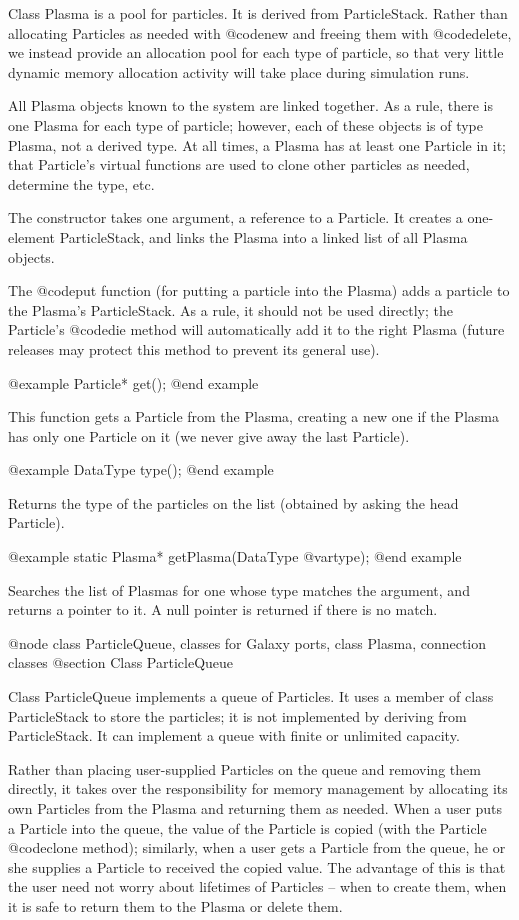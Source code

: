 Class Plasma is a pool for particles.  It is derived from ParticleStack.
Rather than allocating Particles as needed with @code{new} and freeing
them with @code{delete}, we instead provide an allocation pool for each
type of particle, so that very little dynamic memory allocation activity
will take place during simulation runs.

All Plasma objects known to the system are linked together.  As a rule,
there is one Plasma for each type of particle; however, each of these
objects is of type Plasma, not a derived type.  At all times, a Plasma
has at least one Particle in it; that Particle's virtual functions are
used to clone other particles as needed, determine the type, etc.

The constructor takes one argument, a reference to a Particle.  It
creates a one-element ParticleStack, and links the Plasma into a linked
list of all Plasma objects.

The @code{put} function (for putting a particle into the Plasma) adds a
particle to the Plasma's ParticleStack.  As a rule, it should not be
used directly; the Particle's @code{die} method will automatically add
it to the right Plasma (future releases may protect this method to
prevent its general use).

@example
Particle* get();
@end example

This function gets a Particle from the Plasma, creating a new one if
the Plasma has only one Particle on it (we never give away the last
Particle).

@example
DataType type();
@end example

Returns the type of the particles on the list (obtained by asking the
head Particle).

@example
static Plasma* getPlasma(DataType @var{type});
@end example

Searches the list of Plasmas for one whose type matches the argument,
and returns a pointer to it.  A null pointer is returned if there is
no match.

@node class ParticleQueue, classes for Galaxy ports, class Plasma, connection classes
@section Class ParticleQueue

Class ParticleQueue implements a queue of Particles.  It uses a member
of class ParticleStack to store the particles; it is not implemented
by deriving from ParticleStack.  It can implement a queue with finite
or unlimited capacity.

Rather than placing user-supplied Particles on the queue and removing
them directly, it takes over the responsibility for memory management
by allocating its own Particles from the Plasma and returning them
as needed.  When a user puts a Particle into the queue, the value of
the Particle is copied (with the Particle @code{clone} method);
similarly, when a user gets a Particle from the queue, he or she
supplies a Particle to received the copied value.  The advantage of
this is that the user need not worry about lifetimes of Particles --
when to create them, when it is safe to return them to the Plasma
or delete them.

